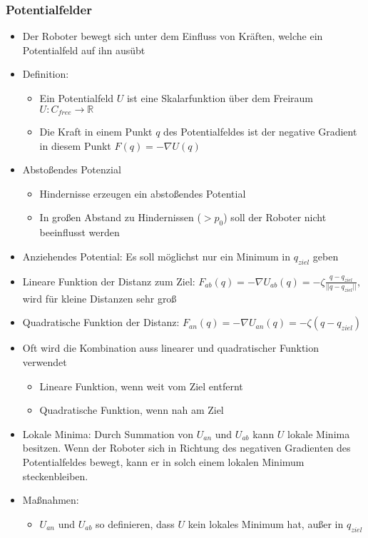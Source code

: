 \documentclass[paper=a4, fontsize=11pt]{scrartcl} %
\numberwithin{equation}{section} %
\numberwithin{figure}{section} %
\numberwithin{table}{section} %
\begin{document}
\subsubsection{Potentialfelder}

\begin{itemize}
\item Der Roboter bewegt sich unter dem Einfluss von Kräften, welche ein Potentialfeld auf ihn ausübt
\item Definition:
\begin{itemize}
\item Ein Potentialfeld $U$ ist eine Skalarfunktion über dem Freiraum $U: C_{free} \rightarrow \mathbb{R}$
\item Die Kraft in einem Punkt $q$ des Potentialfeldes ist der negative Gradient in diesem Punkt $F(q) = - \nabla U(q)$
\end{itemize}
\item Abstoßendes Potenzial
\begin{itemize}
\item Hindernisse erzeugen ein abstoßendes Potential
\item In großen Abstand zu Hindernissen ($>p_0$) soll der Roboter nicht beeinflusst werden
\end{itemize}
\item Anziehendes Potential: Es soll möglichst nur ein Minimum in $q_{ziel}$ geben
\item Lineare Funktion der Distanz zum Ziel: $F_{ab}(q) = - \nabla U_{ab}(q) = - \zeta \frac{q-q_{ziel}}{||q-q_{ziel}||}$, wird für kleine Distanzen sehr groß
\item Quadratische Funktion der Distanz: $F_{an}(q) = - \nabla U_{an}(q) = - \zeta(q-q_{ziel})$
\item Oft wird die Kombination auss linearer und quadratischer Funktion verwendet
\begin{itemize}
\item Lineare Funktion, wenn weit vom Ziel entfernt
\item Quadratische Funktion, wenn nah am Ziel
\end{itemize}
\item Lokale Minima: Durch Summation von $U_{an}$ und $U_{ab}$ kann $U$ lokale Minima besitzen. Wenn der Roboter sich in Richtung des negativen Gradienten des Potentialfeldes bewegt, kann er in solch einem lokalen Minimum steckenbleiben.
\item Maßnahmen:
\begin{itemize}
\item $U_{an}$ und $U_{ab}$ so definieren, dass $U$ kein lokales Minimum hat, außer in $q_{ziel}$
\end{itemize}
\end{itemize}
\end{document}
